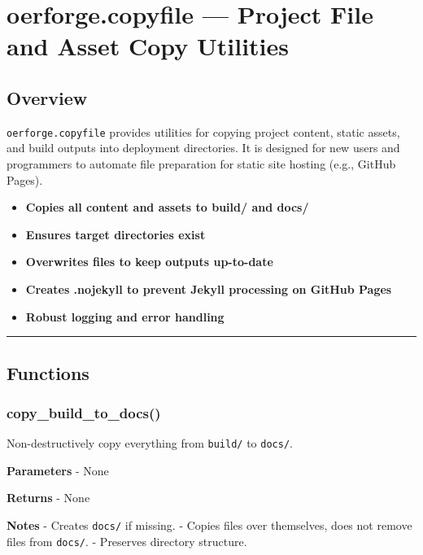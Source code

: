 \section{oerforge.copyfile --- Project File and Asset Copy
Utilities}\label{oerforge.copyfile-project-file-and-asset-copy-utilities}

\subsection{Overview}\label{overview}

\texttt{oerforge.copyfile} provides utilities for copying project
content, static assets, and build outputs into deployment directories.
It is designed for new users and programmers to automate file
preparation for static site hosting (e.g., GitHub Pages).

\begin{itemize}
\tightlist
\item
  \textbf{Copies all content and assets to build/ and docs/}
\item
  \textbf{Ensures target directories exist}
\item
  \textbf{Overwrites files to keep outputs up-to-date}
\item
  \textbf{Creates .nojekyll to prevent Jekyll processing on GitHub
  Pages}
\item
  \textbf{Robust logging and error handling}
\end{itemize}

\begin{center}\rule{0.5\linewidth}{0.5pt}\end{center}

\subsection{Functions}\label{functions}

\subsubsection{copy\_build\_to\_docs()}\label{copy_build_to_docs}

Non-destructively copy everything from \texttt{build/} to
\texttt{docs/}.

\textbf{Parameters} - None

\textbf{Returns} - None

\textbf{Notes} - Creates \texttt{docs/} if missing. - Copies files over
themselves, does not remove files from \texttt{docs/}. - Preserves
directory structure.

